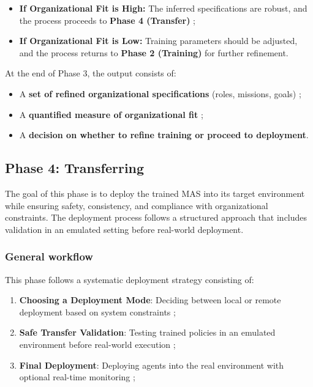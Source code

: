 \documentclass[pdflatex,sn-mathphys-num]{sn-jnl}%
\theoremstyle{thmstyleone}%
\theoremstyle{thmstyletwo}%
\theoremstyle{thmstylethree}%
\begin{document}
\begin{itemize}
    \item \textbf{If Organizational Fit is High:} The inferred specifications are robust, and the process proceeds to \textbf{Phase 4 (Transfer)} ;
    \item \textbf{If Organizational Fit is Low:} Training parameters should be adjusted, and the process returns to \textbf{Phase 2 (Training)} for further refinement.
\end{itemize}

At the end of Phase 3, the output consists of:
\begin{itemize}
    \item A \textbf{set of refined organizational specifications} (roles, missions, goals) ;
    \item A \textbf{quantified measure of organizational fit} ;
    \item A \textbf{decision on whether to refine training or proceed to deployment}.
\end{itemize}

\subsection{Phase 4: Transferring}

The goal of this phase is to deploy the trained MAS into its target environment while ensuring safety, consistency, and compliance with organizational constraints. The deployment process follows a structured approach that includes validation in an emulated setting before real-world deployment.

\subsubsection{General workflow}
This phase follows a systematic deployment strategy consisting of:
\begin{enumerate}
    \item \textbf{Choosing a Deployment Mode}: Deciding between local or remote deployment based on system constraints ;
    \item \textbf{Safe Transfer Validation}: Testing trained policies in an emulated environment before real-world execution ;
    \item \textbf{Final Deployment}: Deploying agents into the real environment with optional real-time monitoring ;
\end{enumerate}
\end{document}
